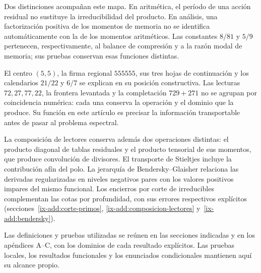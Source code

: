 Dos distinciones acompañan este mapa. En aritmética, el período de una acción
residual no sustituye la irreducibilidad del producto. En análisis, una
factorización positiva de los momentos de memoria no se identifica
automáticamente con la de los momentos aritméticos. Las constantes
\(8/81\) y \(5/9\) pertenecen, respectivamente, al balance de compresión y
a la razón modal de memoria; sus pruebas conservan esas funciones distintas.

El centro \((5,5)\), la firma regional \(555555\), sus tres hojas de
continuación y los calendarios \(21/22\) y \(6/7\) se explican en su posición
constructiva. Las lecturas \(72,27,77,22\), la frontera levantada y la
completación \(729+271\) no se agrupan por coincidencia numérica: cada una
conserva la operación y el dominio que la produce. Su función en este
artículo es precisar la información transportable antes de pasar al
problema espectral.

La composición de lectores conserva además dos operaciones distintas:
el producto diagonal de tablas residuales y el producto tensorial de
sus momentos, que produce convolución de divisores. El transporte de
Stieltjes incluye la contribución afín del polo. La jerarquía de
Bendersky--Glaisher relaciona las derivadas regularizadas en niveles
negativos pares con los valores positivos impares del mismo funcional.
Los encierros por corte de irreducibles complementan las cotas por
profundidad, con sus errores respectivos explícitos
(secciones~\ref{ix-add:corte-primos},
\ref{ix-add:composicion-lectores} y~\ref{ix-add:bendersky}).

Las definiciones y pruebas utilizadas se reúnen en las secciones indicadas
y en los apéndices A--C, con los dominios de cada resultado explícitos.
Las pruebas locales, los resultados funcionales y los enunciados
condicionales mantienen aquí su alcance propio.
